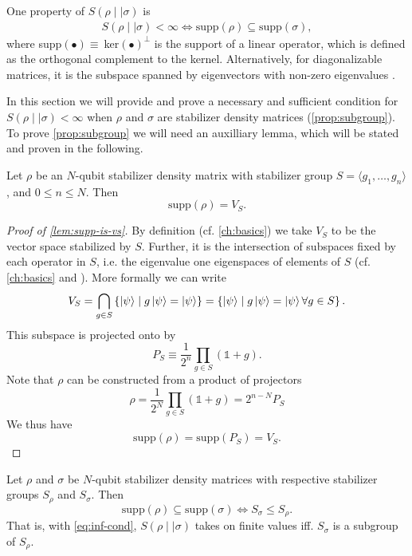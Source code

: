 One property of $S(\rho\mid\mid\sigma)$ is
\cite{leditzkyRelativeEntropiesTheir2016}
\begin{align}\label{eq:inf-cond}
  S(\rho\mid\mid\sigma) < \infty \Longleftrightarrow \mathrm{supp}(\rho) \subseteq
  \mathrm{supp}(\sigma)
,\end{align}
where supp$(\bullet)\equiv\ $ker$(\bullet)^\perp$ is the support of a linear
operator, which is defined as the orthogonal complement to the kernel.
Alternatively, for diagonalizable matrices, it is the subspace spanned by
eigenvectors with non-zero eigenvalues
\cite{schumacherRelativeEntropyQuantum2000}.

In this section we will provide and prove a necessary and sufficient condition
for $S(\rho\mid\mid\sigma)<\infty$ when $\rho$ and $\sigma$ are stabilizer
density matrices (\cref{prop:subgroup}). 
To prove \cref{prop:subgroup} we will need an auxilliary lemma, which will
be stated and proven in the following.
\begin{lem}\label{lem:supp-is-vs}
  Let $\rho$ be an $N$-qubit stabilizer density matrix with stabilizer group $S = \langle
  g_1, \ldots, g_n \rangle$, and $0\leq n \leq N$.
  Then \[ \mathrm{supp}(\rho) = V_{S}.\]
\end{lem}
\begin{proof}[Proof of \cref{lem:supp-is-vs}]
  By definition (cf. \cref{ch:basics}) we take $V_{S}$ to be the vector space
  stabilized by $S$.  Further, it is the intersection of subspaces fixed by
  each operator in $S$, i.e. the eigenvalue one eigenspaces of elements of $S$
  (cf.  \cref{ch:basics} and \cite{nielsenQuantumComputationQuantum2010}). More
  formally we can write
  \[ 
    V_S = \bigcap_{g \in S}  \left\{\ket{\psi} \mid g\ket{\psi} =
    \ket{\psi}\right\} = \left\{\ket{\psi} \mid g\ket{\psi} =
    \ket{\psi} \forall g \in S\right\}.
  \]
  This subspace is projected onto by
  \[ P_S \equiv \frac{1}{2^n} \prod_{g\in S} \left(\mathds{1} + g\right).\]
  Note that $\rho$ can be constructed from a product of projectors
  \cite{gottesmanStabilizerCodesQuantum1997}
  \[ \rho = \frac{1}{2^N} \prod_{g \in S} \left(\mathds{1} + g\right) = 2^{n-N} P_S \]
  We thus have
  \[ \mathrm{supp}(\rho) = \mathrm{supp}(P_S) = V_S. \]
\end{proof}

\begin{prop}\label{prop:subgroup}
  Let $\rho$ and $\sigma$ be $N$-qubit stabilizer density matrices with
  respective stabilizer groups $S_\rho$ and $S_\sigma$. Then
  \[ \mathrm{supp}(\rho)\subseteq \mathrm{supp}(\sigma) \Longleftrightarrow
  S_\sigma \leq S_\rho. \]
  That is, with \cref{eq:inf-cond}, $S(\rho\mid\mid\sigma)$ takes on finite values iff. $S_\sigma$ is a
  subgroup of $S_\rho$.
\end{prop}

